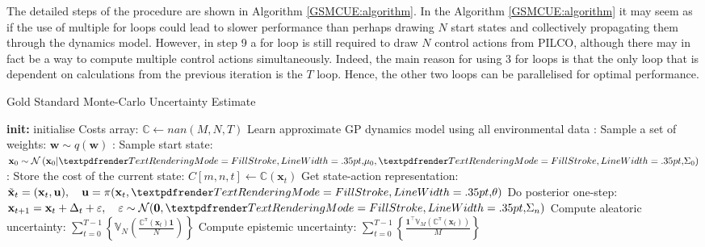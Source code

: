 The detailed steps of the procedure are shown in Algorithm \ref{GSMCUE:algorithm}. In the Algorithm \ref{GSMCUE:algorithm} it may seem as if the use of multiple for loops could lead to slower performance than perhaps drawing $N$ start states and collectively propagating them through the dynamics model. However, in step 9 a for loop is still required to draw $N$ control actions from PILCO, although there may in fact be a way to compute multiple control actions simultaneously. Indeed, the main reason for using 3 for loops is that the only loop that is dependent on calculations from the previous iteration is the $T$ loop. Hence, the other two loops can be parallelised for optimal performance.
\begin{algorithm}
\caption{Gold Standard Monte-Carlo Uncertainty Estimate}\label{GSMCUE:algorithm}
\begin{algorithmic}[1]
\State \textbf{init:} initialise Costs array: $\mathbb{C}\gets nan(M,N,T)$
\State Learn approximate GP dynamics model using all environmental data 
:
\State Sample a set of weights: $\mathbf{w}\sim q(\mathbf{w})$ 
:
\State Sample start state: $\mathbf{x}_{0} \sim \mathcal{N}\left(\mathbf{x}_{0} | \boldgreek{\mu}_{0}, \boldgreek{\Sigma}_{0}\right)$
:
\State Store the cost of the current state: $C[m,n,t]\gets \mathbb{C}(\mathbf{x}_{t})$  
\State Get state-action representation: $\tilde{\mathbf{x}}_{t}=(\mathbf{x}_{t},\mathbf{u}), \quad\mathbf{u}=\pi(\mathbf{x}_{t}, \boldgreek{\theta})$
\State Do posterior one-step: $\mathbf{x}_{t+1}=\mathbf{x}_{t}+\Delta_{t}+\varepsilon, \quad \varepsilon \sim \mathcal{N}(\mathbf{0},\boldgreek{\Sigma}_{n})$ 
\EndFor
\EndFor
\EndFor
\State Compute aleatoric uncertainty: $\sum^{T-1}_{t=0}\left\{\mathbb{V}_{N}\left(\frac{\mathbb{C}^{\pi}(\mathbf{x}_{t})\mathbf{1}}{N}\right)\right\}$
\State Compute epistemic uncertainty: $\sum^{T-1}_{t=0}\left\{\frac{\mathbf{1}^{\top}\mathbb{V}_{M}\left(\mathbb{C}^{\pi}(\mathbf{x}_{t})\right)}{M}\right\}$ 
\end{algorithmic}
\end{algorithm}

\clearpage

